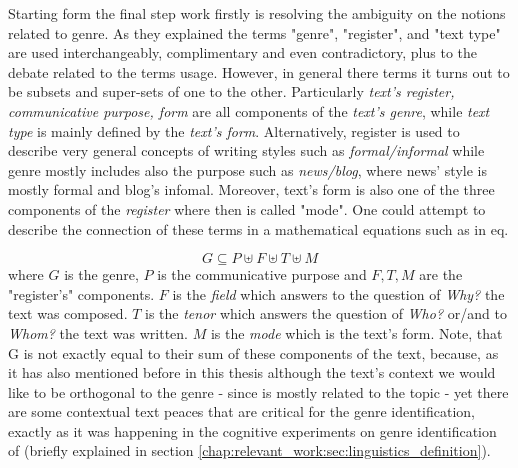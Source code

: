 Starting form the final step \parencite{melissourgou2017genre} work firstly is resolving the ambiguity on the notions related to genre. As they explained the terms "genre", "register", and "text type" are used interchangeably, complimentary and even contradictory, plus to the debate related to the terms usage. However, in general there terms it turns out to be subsets and super-sets of one to the other. Particularly \textit{text's register, communicative purpose, form} are all components of the \textit{text's genre}, while \textit{text type} is mainly defined by the \textit{text's form}. Alternatively, register is used to describe very general concepts of writing styles such as \textit{formal/informal} while genre mostly includes also the purpose such as \textit{news/blog}, where news' style is mostly formal and blog's infomal. Moreover, text's form is also one of the three components of the \textit{register} where then is called "mode". One could attempt to describe the connection of these terms in a mathematical equations such as in eq.  

\begin{equation}\label{eq:genre_notion_in_math}
	G  \subseteq P \uplus F \uplus T \uplus M
\end{equation}
where $G$ is the genre, $P$ is the communicative purpose and $F, T, M$ are the "register's" components. $F$ is the \textit{field} which answers to the question of \textit{Why?} the text was composed. $T$ is the \textit{tenor} which answers the question of \textit{Who?} or/and to \textit{Whom?} the text was written. $M$ is the \textit{mode} which is the text's form. Note, that G is not exactly equal to their sum of these components of the text, because, as it has also mentioned before in this thesis although the text's context we would like to be orthogonal to the genre - since is mostly related to the topic - yet there are some contextual text peaces that are critical for the genre identification, exactly as it was happening in the cognitive experiments on genre identification of \parencite{clark2014you, lieungnapar2017genre} (briefly explained in section \ref{chap:relevant_work:sec:linguistics_definition}).

